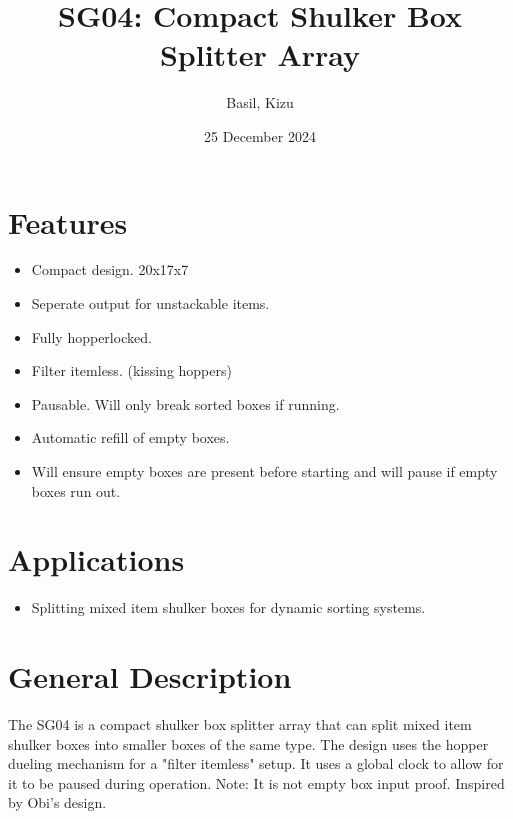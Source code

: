 \documentclass[10pt]{datasheet}
\title{SG04: Compact Shulker Box Splitter Array}
\author{Basil, Kizu}
\date{25 December 2024}
\begin{document}
\maketitle

\section{Features}
\begin{itemize}
\item{Compact design. 20x17x7}
\item{Seperate output for unstackable items.}
\item{Fully hopperlocked.}
\item{Filter itemless. (kissing hoppers)}
\item{Pausable. Will only break sorted boxes if running.}
\item{Automatic refill of empty boxes.}
\item{Will ensure empty boxes are present before starting and will pause if empty boxes run out.}
\end{itemize}

\section{Applications}

\begin{itemize}
\item{Splitting mixed item shulker boxes for dynamic sorting systems.}
\end{itemize}

\section{General Description}
The SG04 is a compact shulker box splitter array that can split mixed item shulker boxes into smaller boxes of the same type. The design uses the hopper dueling mechanism for a "filter itemless" setup. It uses a global clock to allow for it to be paused during operation. Note: It is not empty box input proof. Inspired by Obi's design.
\vfill\break
\end{document}
